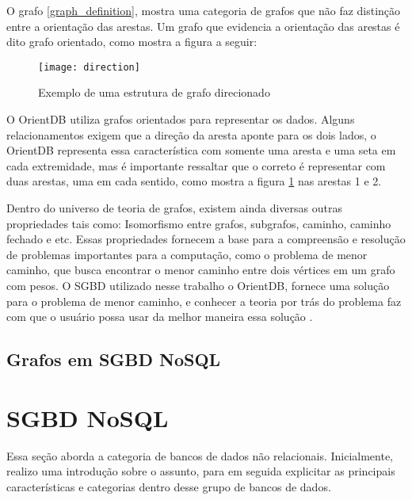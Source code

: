 	O grafo \ref{graph_definition}, mostra uma categoria de grafos que não faz distinção entre a orientação das arestas. Um grafo que evidencia a orientação das arestas é dito grafo orientado, como mostra a figura a seguir:
	
\begin{figure}[H]
	\centering
    \texttt{[image: direction]}
    \caption{Exemplo de uma estrutura de grafo direcionado}
    \label{graph_direction}
\end{figure}

	O OrientDB utiliza grafos orientados para representar os dados. Alguns relacionamentos exigem que a direção da aresta aponte para os dois lados, o OrientDB representa essa característica com somente uma aresta e uma seta em cada extremidade, mas é importante ressaltar que o correto é representar com duas arestas, uma em cada sentido, como mostra a figura \ref{graph_direction} nas arestas 1 e 2.
	
	Dentro do universo de teoria de grafos, existem ainda diversas outras propriedades tais como: Isomorfismo entre grafos, subgrafos, caminho, caminho fechado e etc. Essas propriedades fornecem a base para a compreensão e resolução de problemas importantes para a computação, como o problema de menor caminho, que busca encontrar o menor caminho entre dois vértices em um grafo com pesos. O SGBD utilizado nesse trabalho o OrientDB, fornece uma solução para o problema de menor caminho, e conhecer a teoria por trás do problema faz com que o usuário possa usar da melhor maneira essa solução \cite{orientShortestPath}.
	
\subsection{Grafos em SGBD NoSQL}
\section{SGBD NoSQL}
	Essa seção aborda a categoria de bancos de dados não relacionais. Inicialmente, realizo uma introdução sobre o assunto, para em seguida explicitar as principais características e categorias dentro desse grupo de bancos de dados.
	
